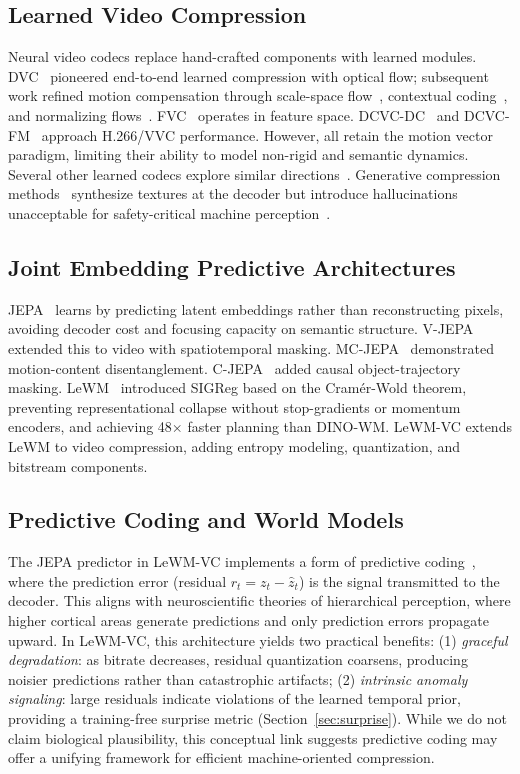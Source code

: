 \documentclass{article}
\begin{document}
\subsection{Learned Video Compression}
Neural video codecs replace hand-crafted components with learned modules. DVC~\cite{lu2019dvc} pioneered end-to-end learned compression with optical flow; subsequent work refined motion compensation through scale-space flow~\cite{agustsson2020scale}, contextual coding~\cite{li2021dcvc}, and normalizing flows~\cite{ho2022canf}. FVC~\cite{hu2022fvc} operates in feature space. DCVC-DC~\cite{li2022dcvcdc} and DCVC-FM~\cite{li2023dcvcfm} approach H.266/VVC performance. However, all retain the motion vector paradigm, limiting their ability to model non-rigid and semantic dynamics. Several other learned codecs explore similar directions~\cite{rippel2019lvc,habibian2019vcrd}. Generative compression methods~\cite{agustsson2019generative,muckley2023generative} synthesize textures at the decoder but introduce hallucinations unacceptable for safety-critical machine perception~\cite{duan2020vcm}.

\subsection{Joint Embedding Predictive Architectures}
JEPA~\cite{lecun2022path} learns by predicting latent embeddings rather than reconstructing pixels, avoiding decoder cost and focusing capacity on semantic structure. V-JEPA~\cite{bardes2024vjepa} extended this to video with spatiotemporal masking. MC-JEPA~\cite{assran2023mcjepa} demonstrated motion-content disentanglement. C-JEPA~\cite{balestriero2024cjepa} added causal object-trajectory masking. LeWM~\cite{maes2025leworldmodel} introduced SIGReg based on the Cram\'{e}r-Wold theorem, preventing representational collapse without stop-gradients or momentum encoders, and achieving 48$\times$ faster planning than DINO-WM. LeWM-VC extends LeWM to video compression, adding entropy modeling, quantization, and bitstream components.

\subsection{Predictive Coding and World Models}
The JEPA predictor in LeWM-VC implements a form of predictive coding~\cite{rao1999predictive}, where the prediction error (residual $r_t = z_t - \hat{z}_t$) is the signal transmitted to the decoder. This aligns with neuroscientific theories of hierarchical perception, where higher cortical areas generate predictions and only prediction errors propagate upward. In LeWM-VC, this architecture yields two practical benefits: (1) \textit{graceful degradation}: as bitrate decreases, residual quantization coarsens, producing noisier predictions rather than catastrophic artifacts; (2) \textit{intrinsic anomaly signaling}: large residuals indicate violations of the learned temporal prior, providing a training-free surprise metric (Section~\ref{sec:surprise}). While we do not claim biological plausibility, this conceptual link suggests predictive coding may offer a unifying framework for efficient machine-oriented compression.
\end{document}
